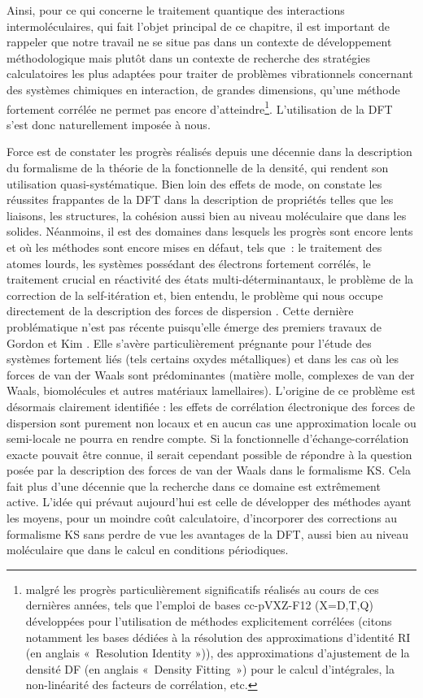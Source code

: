 	Ainsi, pour ce qui concerne le traitement quantique des interactions intermoléculaires, qui fait l’objet principal de ce chapitre, il est important de rappeler que notre travail ne se situe pas dans un contexte de développement méthodologique mais plutôt dans un contexte de recherche des stratégies calculatoires les plus adaptées pour traiter de problèmes vibrationnels concernant des systèmes chimiques en interaction, de grandes dimensions, qu’une méthode fortement corrélée ne permet pas encore d’atteindre\footnote{malgré les progrès particulièrement significatifs réalisés au cours de ces dernières années, tels que l’emploi de bases cc-pVXZ-F12 (X=D,T,Q) développées pour l’utilisation de méthodes explicitement corrélées (citons notamment les bases dédiées à la résolution des approximations d'identité RI (en anglais « Resolution Identity »)), des approximations d'ajustement de la densité DF (en anglais « Density Fitting ») pour le calcul d’intégrales, la non-linéarité des facteurs de corrélation, etc.}. L’utilisation de la DFT s’est donc naturellement imposée à nous.
	
	Force est de constater les progrès réalisés depuis une décennie dans la description du formalisme de la théorie de la fonctionnelle de la densité, qui rendent son utilisation quasi-systématique. Bien loin des effets de mode, on constate les réussites frappantes de la DFT dans la description de propriétés telles que les liaisons, les structures, la cohésion aussi bien au niveau moléculaire que dans les solides. Néanmoins, il est des domaines dans lesquels les progrès sont encore lents et où les méthodes sont encore mises en défaut, tels que : le traitement des atomes lourds, les systèmes possédant des électrons fortement corrélés, le traitement crucial en réactivité des états multi-déterminantaux, le problème de la correction de la self-itération et, bien entendu, le problème qui nous occupe directement de la description des forces de dispersion \cite{gerber2005description}. Cette dernière problématique n’est pas récente puisqu'elle émerge des premiers travaux de Gordon et Kim \cite{gordon1972theory}. Elle s’avère particulièrement prégnante pour l’étude des systèmes fortement liés (tels certains oxydes métalliques) et dans les cas où les forces de van der Waals sont prédominantes (matière molle, complexes de van der Waals, biomolécules et autres matériaux lamellaires). L’origine de ce problème est désormais clairement identifiée : les effets de corrélation électronique des forces de dispersion sont purement non locaux et en aucun cas une approximation locale ou semi-locale ne pourra en rendre compte. Si la fonctionnelle d’échange-corrélation exacte pouvait être connue, il serait cependant possible de répondre à la question posée par la description des forces de van der Waals dans le formalisme KS. Cela fait plus d’une décennie que la recherche dans ce domaine est extrêmement active. L’idée qui prévaut aujourd’hui est celle de développer des méthodes ayant les moyens, pour un moindre coût calculatoire, d’incorporer des corrections au formalisme KS sans perdre de vue les avantages de la DFT, aussi bien au niveau moléculaire que dans le calcul en conditions périodiques. 
	
